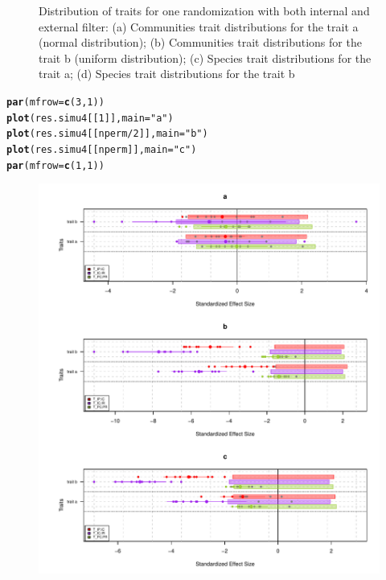\documentclass[12pt]{article}\usepackage[]{graphicx}\usepackage[]{color}
\makeatletter
\def\maxwidth{ %
  \ifdim\Gin@nat@width>\linewidth
    \linewidth
  \else
    \Gin@nat@width
  \fi
}
\newcommand{\hlnum}[1]{\textcolor[rgb]{0.686,0.059,0.569}{#1}}%
\newcommand{\hlstr}[1]{\textcolor[rgb]{0.192,0.494,0.8}{#1}}%
\newcommand{\hlopt}[1]{\textcolor[rgb]{0,0,0}{#1}}%
\newcommand{\hlstd}[1]{\textcolor[rgb]{0.345,0.345,0.345}{#1}}%
\newcommand{\hlkwc}[1]{\textcolor[rgb]{0.333,0.667,0.333}{#1}}%
\newcommand{\hlkwd}[1]{\textcolor[rgb]{0.737,0.353,0.396}{\textbf{#1}}}%
\newenvironment{kframe}{%
 \def\at@end@of@kframe{}%
 \ifinner\ifhmode%
  \def\at@end@of@kframe{\end{minipage}}%
  \begin{minipage}{\columnwidth}%
 \fi\fi%
 \def\FrameCommand##1{\hskip\@totalleftmargin \hskip-\fboxsep
 \colorbox{shadecolor}{##1}\hskip-\fboxsep
     \hskip-\linewidth \hskip-\@totalleftmargin \hskip\columnwidth}%
 \MakeFramed {\advance\hsize-\width
   \@totalleftmargin\z@ \linewidth\hsize
   \@setminipage}}%
 {\par\unskip\endMakeFramed%
 \at@end@of@kframe}
\newenvironment{knitrout}{}{} %
\makeatother
\begin{document}
\begin{knitrout}
\begin{figure}
{}

\caption[Distribution of traits for one randomization with both internal and external filter]{Distribution of traits for one randomization with both internal and external filter: (a) Communities trait distributions for the trait a (normal distribution); (b) Communities trait distributions for the trait b (uniform distribution); (c) Species trait distributions for the trait a; (d) Species trait distributions for the trait b}\label{fig:InEx_Filter_plots}
\end{figure}


\end{knitrout}

\begin{knitrout}\small
{}\color{fgcolor}\begin{kframe}
\begin{alltt}
\hlkwd{par}\hlstd{(}\hlkwc{mfrow}\hlstd{=}\hlkwd{c}\hlstd{(}\hlnum{3}\hlstd{,} \hlnum{1}\hlstd{))}
\hlkwd{plot}\hlstd{(res.simu4[[}\hlnum{1}\hlstd{]],} \hlkwc{main} \hlstd{=} \hlstr{"a"}\hlstd{)}
\hlkwd{plot}\hlstd{(res.simu4[[nperm}\hlopt{/}\hlnum{2}\hlstd{]],} \hlkwc{main} \hlstd{=} \hlstr{"b"}\hlstd{)}
\hlkwd{plot}\hlstd{(res.simu4[[nperm]],} \hlkwc{main} \hlstd{=} \hlstr{"c"}\hlstd{)}
\hlkwd{par}\hlstd{(}\hlkwc{mfrow}\hlstd{=}\hlkwd{c}\hlstd{(}\hlnum{1}\hlstd{,} \hlnum{1}\hlstd{))}
\end{alltt}
\end{kframe}\begin{figure}

{\centering \includegraphics[width=\maxwidth]{figure/InEx_Filter_plots_Tstats-1} 

}
\end{figure}
\end{knitrout}
\end{document}
